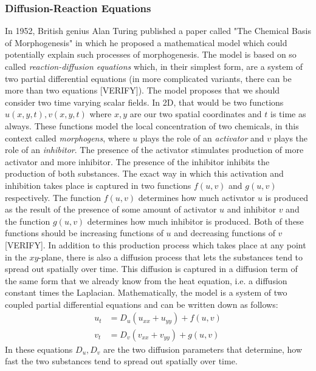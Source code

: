 \subsubsection{Diffusion-Reaction Equations} In 1952, British genius Alan Turing published a paper called "The Chemical Basis of Morphogenesis" in which he proposed a mathematical model which could potentially explain such processes of morphogenesis. The model is based on so called \emph{reaction-diffusion equations} which, in their simplest form, are a system of two partial differential equations (in more complicated variants, there can be more than two equations [VERIFY]). The model proposes that we should consider two time varying scalar fields. In 2D, that would be two functions $u(x,y,t), v(x,y,t)$ where $x,y$ are our two spatial coordinates and $t$ is time as always. These functions model the local concentration of two chemicals, in this context called \emph{morphogens}, where $u$ plays the role of an \emph{activator} and $v$ plays the role of an \emph{inhibitor}. The presence of the activator stimulates production of more activator and more inhibitor. The presence of the inhibitor inhibits the production of both substances. The exact way in which this activation and inhibition takes place is captured in two functions $f(u,v)$ and $g(u,v)$ respectively. The function $f(u,v)$ determines how much activator $u$ is produced as the result of the presence of some amount of activator $u$ and inhibitor $v$ and the function $g(u,v)$ determines how much inhibitor is produced. Both of these functions should be increasing functions of $u$ and decreasing functions of $v$ [VERIFY]. In addition to this production process which takes place at any point in the $xy$-plane, there is also a diffusion process that lets the substances tend to spread out spatially over time. This diffusion is captured in a diffusion term of the same form that we already know from the heat equation, i.e. a diffusion constant times the Laplacian. Mathematically, the model is a system of two coupled partial differential equations and can be written down as follows:
\begin{eqnarray}
u_t &= D_u (u_{xx} + u_{yy}) + f(u,v)  \\
v_t &= D_v (v_{xx} + v_{yy}) + g(u,v) 
\end{eqnarray}
In these equations $D_u, D_v$ are the two diffusion parameters that determine, how fast the two substances tend to spread out spatially over time.


